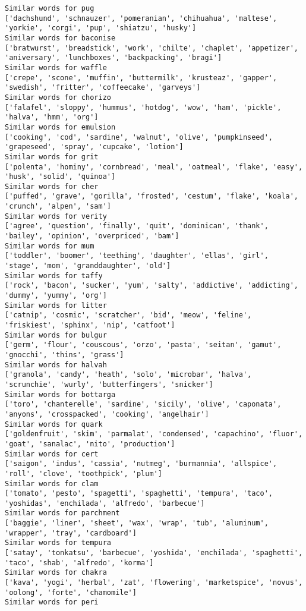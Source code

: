 \documentclass[11pt]{article}
\begin{document}
\begin{Verbatim}[commandchars=\\\{\}]
Similar words for pug
['dachshund', 'schnauzer', 'pomeranian', 'chihuahua', 'maltese', 'yorkie', 'corgi', 'pup', 'shiatzu', 'husky']
Similar words for baconise
['bratwurst', 'breadstick', 'work', 'chilte', 'chaplet', 'appetizer', 'aniversary', 'lunchboxes', 'backpacking', 'bragi']
Similar words for waffle
['crepe', 'scone', 'muffin', 'buttermilk', 'krusteaz', 'gapper', 'swedish', 'fritter', 'coffeecake', 'garveys']
Similar words for chorizo
['falafel', 'sloppy', 'hummus', 'hotdog', 'wow', 'ham', 'pickle', 'halva', 'hmm', 'org']
Similar words for emulsion
['cooking', 'cod', 'sardine', 'walnut', 'olive', 'pumpkinseed', 'grapeseed', 'spray', 'cupcake', 'lotion']
Similar words for grit
['polenta', 'hominy', 'cornbread', 'meal', 'oatmeal', 'flake', 'easy', 'husk', 'solid', 'quinoa']
Similar words for cher
['puffed', 'grave', 'gorilla', 'frosted', 'cestum', 'flake', 'koala', 'crunch', 'alpen', 'sam']
Similar words for verity
['agree', 'question', 'finally', 'quit', 'dominican', 'thank', 'bailey', 'opinion', 'overpriced', 'bam']
Similar words for mum
['toddler', 'boomer', 'teething', 'daughter', 'ellas', 'girl', 'stage', 'mom', 'granddaughter', 'old']
Similar words for taffy
['rock', 'bacon', 'sucker', 'yum', 'salty', 'addictive', 'addicting', 'dummy', 'yummy', 'org']
Similar words for litter
['catnip', 'cosmic', 'scratcher', 'bid', 'meow', 'feline', 'friskiest', 'sphinx', 'nip', 'catfoot']
Similar words for bulgur
['germ', 'flour', 'couscous', 'orzo', 'pasta', 'seitan', 'gamut', 'gnocchi', 'thins', 'grass']
Similar words for halvah
['granola', 'candy', 'heath', 'solo', 'microbar', 'halva', 'scrunchie', 'wurly', 'butterfingers', 'snicker']
Similar words for bottarga
['toro', 'chanterelle', 'sardine', 'sicily', 'olive', 'caponata', 'anyons', 'crosspacked', 'cooking', 'angelhair']
Similar words for quark
['goldenfruit', 'skim', 'parmalat', 'condensed', 'capachino', 'fluor', 'goat', 'sanalac', 'nito', 'production']
Similar words for cert
['saigon', 'indus', 'cassia', 'nutmeg', 'burmannia', 'allspice', 'roll', 'clove', 'toothpick', 'plum']
Similar words for clam
['tomato', 'pesto', 'spagetti', 'spaghetti', 'tempura', 'taco', 'yoshidas', 'enchilada', 'alfredo', 'barbecue']
Similar words for parchment
['baggie', 'liner', 'sheet', 'wax', 'wrap', 'tub', 'aluminum', 'wrapper', 'tray', 'cardboard']
Similar words for tempura
['satay', 'tonkatsu', 'barbecue', 'yoshida', 'enchilada', 'spaghetti', 'taco', 'shab', 'alfredo', 'korma']
Similar words for chakra
['kava', 'yogi', 'herbal', 'zat', 'flowering', 'marketspice', 'novus', 'oolong', 'forte', 'chamomile']
Similar words for peri

\end{Verbatim}
\end{document}
